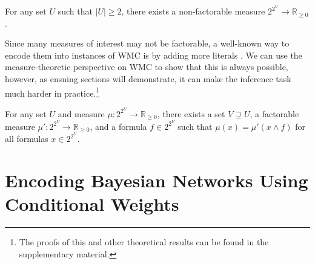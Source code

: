 \begin{theorem}
  For any set $U$ such that $|U| \ge 2$, there exists a non-factorable measure
  $2^{2^{U}} \to \mathbb{R}_{\ge 0}$.
\end{theorem}

Since many measures of interest may not be factorable, a well-known way to
encode them into instances of WMC is by adding more literals
\citep{DBLP:journals/ai/ChaviraD08}. We can use the measure-theoretic
perspective on WMC to show that this is always possible, however, as ensuing
sections will demonstrate, it can make the inference task much harder in
practice.\footnote{The proofs of this and other theoretical results can be found
  in the supplementary material.}

\begin{theorem}
  For any set $U$ and measure $\mu\colon 2^{2^U} \to \mathbb{R}_{\ge 0}$, there
  exists a set $V \supseteq U$, a factorable measure $\mu'\colon 2^{2^V} \to
  \mathbb{R}_{\ge 0}$, and a formula $f \in 2^{2^V}$ such that $\mu(x) = \mu'(x
  \land f)$ for all formulas $x \in 2^{2^U}$.
\end{theorem}

\section{Encoding Bayesian Networks Using Conditional Weights} \label{sec:bns}

